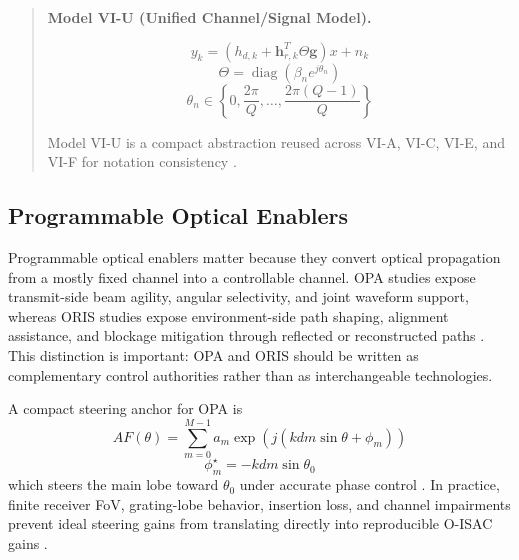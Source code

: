 \documentclass[letterpaper,journal]{IEEEtran}
\begin{document}
\begin{quote}
    \textbf{Model VI-U (Unified Channel/Signal Model).}

    \begin{equation}
        y_k = \left(h_{d,k} + \mathbf{h}_{r,k}^{T}\Theta\mathbf{g}\right)x + n_k
    \end{equation}
    \begin{equation}
        \Theta = \operatorname{diag}\!\left(\beta_n e^{j\theta_n}\right)
    \end{equation}
    \begin{equation}
        \theta_n \in \left\{0,\frac{2\pi}{Q},\ldots,\frac{2\pi(Q-1)}{Q}\right\}
    \end{equation}

    Model VI-U is a compact abstraction reused across VI-A, VI-C, VI-E, and VI-F for notation consistency \cite{O_ISAC_061,O_ISAC_091,O_ISAC_098,O_ISAC_127}.
\end{quote}

\subsection{Programmable Optical Enablers}

Programmable optical enablers matter because they convert optical propagation from a mostly fixed channel into a controllable channel. OPA studies expose transmit-side beam agility, angular selectivity, and joint waveform support, whereas ORIS studies expose environment-side path shaping, alignment assistance, and blockage mitigation through reflected or reconstructed paths \cite{O_ISAC_008,O_ISAC_061,O_ISAC_091,O_ISAC_098,O_ISAC_112}. This distinction is important: OPA and ORIS should be written as complementary control authorities rather than as interchangeable technologies.

A compact steering anchor for OPA is
\begin{equation}
    AF(\theta)=\sum_{m=0}^{M-1} a_m\exp\!\left(j\left(kdm\sin\theta+\phi_m\right)\right)
\end{equation}
\begin{equation}
    \phi_m^{\star}=-kdm\sin\theta_0
\end{equation}
which steers the main lobe toward $\theta_0$ under accurate phase control \cite{O_ISAC_008,O_ISAC_061,O_ISAC_091}. In practice, finite receiver FoV, grating-lobe behavior, insertion loss, and channel impairments prevent ideal steering gains from translating directly into reproducible O-ISAC gains \cite{O_ISAC_061,O_ISAC_091,O_ISAC_098}.
\end{document}
